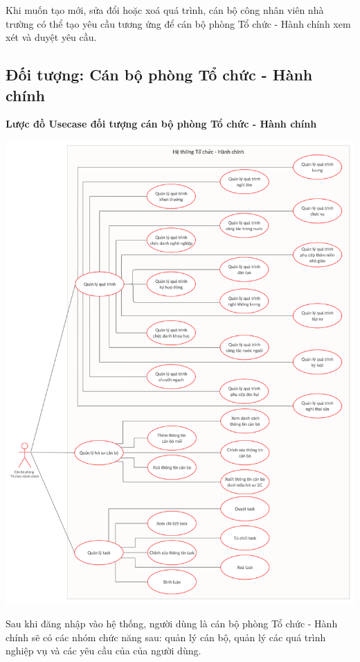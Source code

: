 Khi muốn tạo mới, sửa đổi hoặc xoá quá trình, cán bộ công nhân viên nhà trường có thể tạo yêu cầu tương ứng để cán bộ phòng Tổ chức - Hành chính xem xét và duyệt yêu cầu.

\subsection{Đối tượng: Cán bộ phòng Tổ chức - Hành chính}
\textbf{Lược đồ Usecase đối tượng cán bộ phòng Tổ chức - Hành chính}
\begin{center}
  \captionsetup{type=figure}
  \includegraphics[width=15cm]{img/usecase/nhanVienTCHC.png}
\end{center}

Sau khi đăng nhập vào hệ thống, người dùng là cán bộ phòng Tổ chức - Hành chính sẽ có các nhóm chức năng sau: quản lý cán bộ, quản lý các quá trình nghiệp vụ và các yêu cầu của của người dùng.


